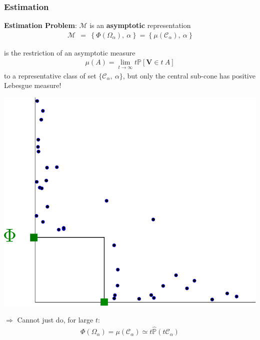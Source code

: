 \documentclass[9pt]{beamer}
\def\mb{\mathbf}
\begin{document}
\begin{frame}
\frametitle{Estimation}
\textbf{Estimation Problem}: $\mathcal{M}$ is an \textbf{asymptotic} representation
\begin{align*}
\mathcal{M} ~~=~~ \big\{~\Phi(\Omega_{\alpha}),~ \alpha~\big\} ~=~ \big\{~\mu(\mathcal{C}_{\alpha}),~ \alpha~\big\}
\end{align*}

is the restriction of an asymptotic measure 
\begin{align*}
\mu(A)=\lim_{t \to \infty} t \mathbb{P}[\mb V\in t~A]
\end{align*}
to a representative class of set $\{\mathcal{C}_\alpha,~\alpha\}$, but only the central sub-cone has positive Lebesgue measure!

\begin{minipage}{0.5\linewidth}
\centering
\includegraphics[scale=0.3]{sourcefigs/representation2D_problem.pdf}
\end{minipage}\hfill
\begin{minipage}{0.5\linewidth}
$\Rightarrow$ Cannot just do, for large $t$:
\begin{align*}
\Phi(\Omega_\alpha) = \mu(\mathcal{C}_\alpha) \simeq t \widehat{\mathbb{P}}(t \mathcal{C}_\alpha)
\end{align*}
\end{minipage}

\end{frame}
\end{document}
